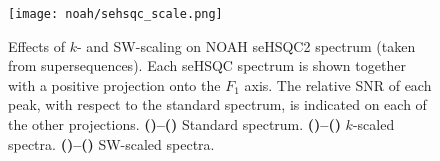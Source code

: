\begin{figure}[!htbp]
    \centering
    \texttt{[image: noah/sehsqc\_scale.png]}%
    {\label{fig:sehsqc_scale_std2}}%
    {\label{fig:sehsqc_scale_std1}}%
    {\label{fig:sehsqc_scale_k22}}%
    {\label{fig:sehsqc_scale_k21}}%
    {\label{fig:sehsqc_scale_k42}}%
    {\label{fig:sehsqc_scale_k41}}%
    {\label{fig:sehsqc_scale_k82}}%
    {\label{fig:sehsqc_scale_k81}}%
    {\label{fig:sehsqc_scale_sw22}}%
    {\label{fig:sehsqc_scale_sw21}}%
    {\label{fig:sehsqc_scale_sw42}}%
    {\label{fig:sehsqc_scale_sw41}}%
    {\label{fig:sehsqc_scale_sw82}}%
    {\label{fig:sehsqc_scale_sw81}}%
    \caption[Effects of $k$- and SW-scaling on NOAH seHSQC2 spectrum]{
        Effects of $k$- and SW-scaling on NOAH seHSQC2 spectrum (taken from  supersequences).
        Each seHSQC spectrum is shown together with a positive projection onto the $F_1$ axis.
        The relative SNR of each peak, with respect to the standard spectrum, is indicated on each of the other projections.
        \textbf{()--()} Standard spectrum.
        \textbf{()--()} $k$-scaled spectra.
        \textbf{()--()} SW-scaled spectra.
    }
    \label{fig:sehsqc_scale}
\end{figure}

